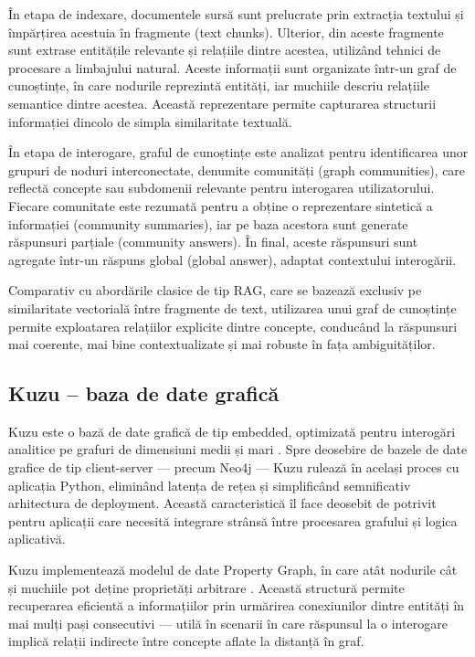 \documentclass[12pt, a4paper, oneside, romanian]{teza-upb}
\begin{document}
În etapa de indexare, documentele sursă sunt prelucrate prin extracția textului și împărțirea acestuia în fragmente (text chunks). Ulterior, din aceste fragmente sunt extrase entitățile relevante și relațiile dintre acestea, utilizând tehnici de procesare a limbajului natural. Aceste informații sunt organizate într-un graf de cunoștințe, în care nodurile reprezintă entități, iar muchiile descriu relațiile semantice dintre acestea. Această reprezentare permite capturarea structurii informației dincolo de simpla similaritate textuală.

În etapa de interogare, graful de cunoștințe este analizat pentru identificarea unor grupuri de noduri interconectate, denumite comunități (graph communities), care reflectă concepte sau subdomenii relevante pentru interogarea utilizatorului. Fiecare comunitate este rezumată pentru a obține o reprezentare sintetică a informației (community summaries), iar pe baza acestora sunt generate răspunsuri parțiale (community answers). În final, aceste răspunsuri sunt agregate într-un răspuns global (global answer), adaptat contextului interogării.

Comparativ cu abordările clasice de tip RAG, care se bazează exclusiv pe similaritate vectorială între fragmente de text, utilizarea unui graf de cunoștințe permite exploatarea relațiilor explicite dintre concepte, conducând la răspunsuri mai coerente, mai bine contextualizate și mai robuste în fața ambiguităților. \cite{edge2024local}

\subsection{Kuzu -- baza de date grafică}

Kuzu este o bază de date grafică de tip embedded, optimizată pentru interogări analitice pe grafuri de dimensiuni medii și mari \cite{kuzu_doc}. Spre deosebire de bazele de date grafice de tip client-server — precum Neo4j — Kuzu rulează în același proces cu aplicația Python, eliminând latența de rețea și simplificând semnificativ arhitectura de deployment. Această caracteristică îl face deosebit de potrivit pentru aplicații care necesită integrare strânsă între procesarea grafului și logica aplicativă.


Kuzu implementează modelul de date Property Graph, în care atât nodurile cât 
și muchiile pot deține proprietăți arbitrare \cite{kuzu_doc, kuzu:cidr}. 
Această structură permite recuperarea eficientă a informațiilor prin urmărirea 
conexiunilor dintre entități în mai mulți pași consecutivi — utilă în scenarii 
în care răspunsul la o interogare implică relații indirecte între concepte 
aflate la distanță în graf.
\end{document}

